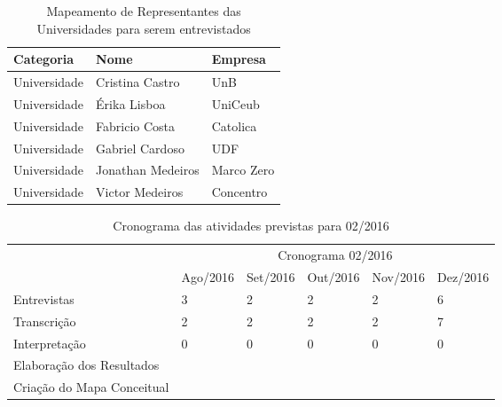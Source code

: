 \begin{table}[!htb]
	\centering
	\label{tabela:sugestao_de_universidades_para_entrevista}
	\begin{tabular}{ | p{3cm} | p{8cm} | p{4cm} | }
		\hline
		Categoria & Nome & Empresa \\ \hline
		Universidade & Cristina Castro & UnB \\ \hline
		Universidade & Érika Lisboa & UniCeub \\ \hline
		Universidade & Fabricio Costa & Catolica \\ \hline
		Universidade & Gabriel Cardoso & UDF \\ \hline
		Universidade & Jonathan Medeiros & Marco Zero \\ \hline		
		Universidade & Victor Medeiros & Concentro \\ \hline
	\end{tabular}
	\caption{Mapeamento de Representantes das Universidades para serem entrevistados}
\end{table}

\begin{table}[!htpb]
	\centering
	\begin{small} 
		\begin{tabular}{|p{5cm}|p{2cm}|p{2cm}|p{2cm}|p{2cm}|p{2cm}|} \hline
		 & \multicolumn{5}{c|}{Cronograma 02/2016}\\ \cline{2-6} 
		\raisebox{1.5ex}{Atividade} & Ago/2016 & Set/2016 & Out/2016 & Nov/2016 & Dez/2016 \\ \hline
		Entrevistas   & 3 & 2 & 2 & 2 & 6 \\ \hline
		Transcrição   & 2 & 2 & 2 & 2 & 7 \\ \hline
		Interpretação & 0 & 0 & 0 & 0 & 0 \\ \hline
		Elaboração dos Resultados    &  &  &  &  &  \\ \hline
		Criação do Mapa Conceitual &   &   &   &   &   \\ \hline
		\end{tabular} 
	\end{small}
	\caption{Cronograma das atividades previstas para 02/2016}
	\label{table:cronograma_2016}
\end{table} 

